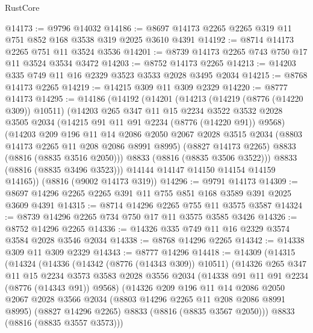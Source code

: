 \begin{lexlean}{RustCore}
\begin{coremodule}
@14173 := @9796 @14032
@14186 := @8697 @14173 @2265 @2265 @319 @11 @751 @852 @168 @3538 @319 @2025 @3610 @4391
@14192 := @8714 @14173 @2265 @751 @11 @3524 @3536
@14201 := @8739 @14173 @2265 @743 @750 @17 @11 @3524 @3534 @3472
@14203 := @8752 @14173 @2265
@14213 := @14203 @335 @749 @11 @16 @2329 @3523 @3533 @2028 @3495 @2034
@14215 := @8768 @14173 @2265
@14219 := @14215 @309 @11 @309 @2329
@14220 := @8777 @14173
@14295 := @14186
    (@14192
      (@14201
        (@14213
          (@14219 (@8776 (@14220 @309)) @10511)
          (@14203
            @265
            @347
            @11
            @15
            @2234
            @3522
            @3532
            @2028
            @3505
            @2034
            (@14215 @91 @11 @91 @2234 (@8776 (@14220 @91)) @9568)
            (@14203
              @209
              @196
              @11
              @14
              @2086
              @2050
              @2067
              @2028
              @3515
              @2034
              (@8803 @14173 @2265 @11 @208 @2086 @8991 @8995)
              (@8827 @14173 @2265)
              @8833
              (@8816 (@8835 @3516 @2050)))
            @8833
            (@8816 (@8835 @3506 @3522)))
          @8833
          (@8816 (@8835 @3496 @3523)))
        @14144
        @14147
        @14150
        @14154
        @14159
        @14165))
    (@8816 (@9002 @14173 @319))
@14296 := @9791 @14173
@14309 := @8697 @14296 @2265 @2265 @391 @11 @755 @851 @168 @3589 @391 @2025 @3609 @4391
@14315 := @8714 @14296 @2265 @755 @11 @3575 @3587
@14324 := @8739 @14296 @2265 @734 @750 @17 @11 @3575 @3585 @3426
@14326 := @8752 @14296 @2265
@14336 := @14326 @335 @749 @11 @16 @2329 @3574 @3584 @2028 @3546 @2034
@14338 := @8768 @14296 @2265
@14342 := @14338 @309 @11 @309 @2329
@14343 := @8777 @14296
@14418 := @14309
    (@14315
      (@14324
        (@14336
          (@14342 (@8776 (@14343 @309)) @10511)
          (@14326
            @265
            @347
            @11
            @15
            @2234
            @3573
            @3583
            @2028
            @3556
            @2034
            (@14338 @91 @11 @91 @2234 (@8776 (@14343 @91)) @9568)
            (@14326
              @209
              @196
              @11
              @14
              @2086
              @2050
              @2067
              @2028
              @3566
              @2034
              (@8803 @14296 @2265 @11 @208 @2086 @8991 @8995)
              (@8827 @14296 @2265)
              @8833
              (@8816 (@8835 @3567 @2050)))
            @8833
            (@8816 (@8835 @3557 @3573)))

\end{coremodule}
\end{lexlean}
